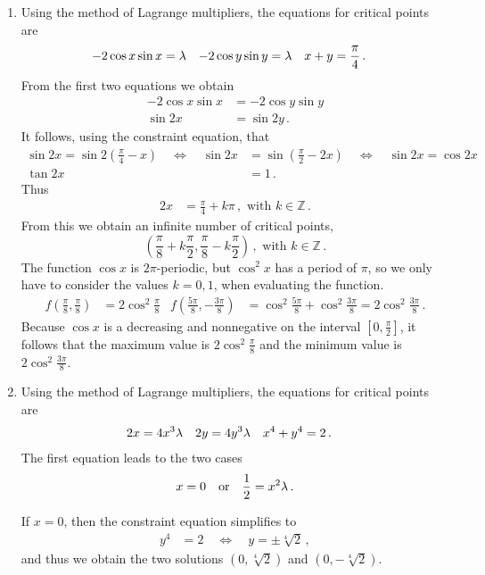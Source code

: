 \begin{solution}
\begin{enumerate}
\item
Using the method of Lagrange multipliers, the equations for critical points are
\begin{align*}
-2 \cos x \sin x &= \lambda &
-2 \cos y \sin y &= \lambda &
x + y &= \frac \pi 4\,.
\end{align*}
From the first two equations we obtain 
\begin{align*}
-2 \cos x \sin x &= -2 \cos y \sin y \\
\sin 2x &= \sin 2y\,.
\end{align*}
It follows, using the constraint equation, that
\begin{align*}
\sin 2x = \sin 2\left(\frac \pi 4 - x \right) \quad\Leftrightarrow\quad
\sin 2x &= \sin \left(\frac \pi 2 - 2x \right) \quad\Leftrightarrow\quad
\sin 2x = \cos 2x \\
\tan 2x &= 1\,.
\end{align*}
Thus
\begin{align*}
2x &= \frac \pi 4 + k \pi\,,\text{ with } k \in \mathbb Z\,.
\end{align*}
From this we obtain an infinite number of critical points,
\[
\left(\frac \pi 8 + k \frac \pi 2,
\frac \pi 8 - k \frac \pi 2\right) \,,\text{ with } k \in \mathbb Z\,.
\]
The function $\cos x$ is $2\pi$-periodic, but $\cos^2 x$ has a period of $\pi$, so we only have to consider the values $k=0,1$, when evaluating the function.
\begin{align*}
f\left( \frac \pi 8, \frac \pi 8 \right) &= 2 \cos^2 \frac \pi 8 &
f\left( \frac {5\pi} 8, -\frac {3\pi} 8 \right) &= \cos^2 \frac {5\pi} 8 + \cos^2 \frac {3\pi} 8 = 2 \cos^2\frac {3\pi} 8\,.
\end{align*}
Because $\cos x$ is a decreasing and nonnegative on the interval $\left[0,\frac \pi 2\right]$, it follows that the maximum value is $2 \cos^2 \frac \pi 8$ and the minimum value is $\displaystyle 2 \cos^2 \frac {3\pi} 8$.

\item
Using the method of Lagrange multipliers, the equations for critical points are
\begin{align*}
2x &= 4x^3 \lambda &
2y &= 4y^3 \lambda &
x^4 + y^4 &= 2\,.
\end{align*}
The first equation leads to the two cases 
\[
x=0 \quad\text{or}\quad
\frac 12 = x^2 \lambda\,.
\]

If $x=0$, then the constraint equation simplifies to
\begin{align*}
y^4 &= 2 \quad\Leftrightarrow\quad
y = \pm \sqrt[4]{2}\,,
\end{align*}
and thus we obtain the two solutions $\left(0, \sqrt[4] 2\right)$ and $\left(0, -\sqrt[4] 2\right)$.


\end{enumerate}
\end{solution}
